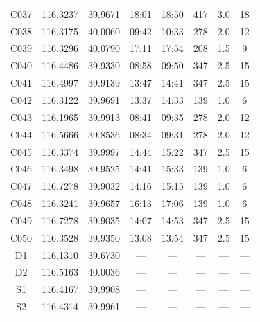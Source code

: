 \documentclass{setp-new}
\begin{document}
\begin{longtable}{@{\extracolsep{\fill}}cccccccc@{}}
C037 & 116.3237 & 39.9671 & 18:01 & 18:50 & 417 & 3.0 & 18\\
C038 & 116.3175 & 40.0060 & 09:42 & 10:33 & 278 & 2.0 & 12\\
C039 & 116.3296 & 40.0790 & 17:11 & 17:54 & 208 & 1.5 & 9\\
C040 & 116.4486 & 39.9330 & 08:58 & 09:50 & 347 & 2.5 & 15\\
C041 & 116.4997 & 39.9139 & 13:47 & 14:41 & 347 & 2.5 & 15\\
C042 & 116.3122 & 39.9691 & 13:37 & 14:33 & 139 & 1.0 & 6\\
C043 & 116.1965 & 39.9913 & 08:41 & 09:35 & 278 & 2.0 & 12\\
C044 & 116.5666 & 39.8536 & 08:34 & 09:31 & 278 & 2.0 & 12\\
C045 & 116.3374 & 39.9997 & 14:44 & 15:22 & 347 & 2.5 & 15\\
C046 & 116.3498 & 39.9525 & 14:41 & 15:33 & 139 & 1.0 & 6\\
C047 & 116.7278 & 39.9032 & 14:16 & 15:15 & 139 & 1.0 & 6\\
C048 & 116.3241 & 39.9657 & 16:13 & 17:06 & 139 & 1.0 & 6\\
C049 & 116.7278 & 39.9035 & 14:07 & 14:53 & 347 & 2.5 & 15\\
C050 & 116.3528 & 39.9350 & 13:08 & 13:54 & 347 & 2.5 & 15\\
D1 & 116.1310 & 39.6730 & --- & --- & --- & --- & ---\\
D2 & 116.5163 & 40.0036 & --- & --- & --- & --- & ---\\
S1 & 116.4167 & 39.9908 & --- & --- & --- & --- & ---\\
S2 & 116.4314 & 39.9961 & --- & --- & --- & --- & ---\\
\end{longtable}
\endgroup
\end{document}

